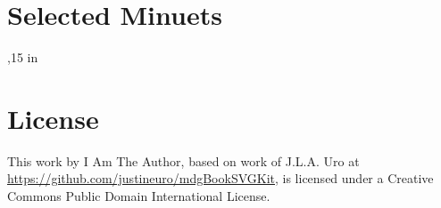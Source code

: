\documentclass[letterpaper,x11names,svgnames,10pt]{article}
\begin{document}
\newpage
\section{Selected Minuets}
{
\topmargin -0.75in
,15 in
	
}	

\section{License}
This work by I Am The Author, based on work of J.L.A. Uro at  \url{https://github.com/justineuro/mdgBookSVGKit}, is licensed under a Creative Commons Public Domain International License.




 
\end{document}
